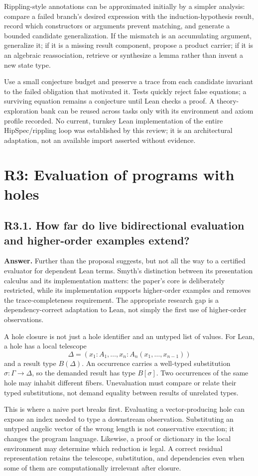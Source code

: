 \documentclass[11pt,a4paper]{article}
\newcommand{\question}[2]{\subsection{#1. #2}\label{q:#1}}
\theoremstyle{definition}
\theoremstyle{remark}
\begin{document}
Rippling-style annotations can be approximated initially by a simpler analysis: compare a failed branch's desired expression with the induction-hypothesis result, record which constructors or arguments prevent matching, and generate a bounded candidate generalization. If the mismatch is an accumulating argument, generalize it; if it is a missing result component, propose a product carrier; if it is an algebraic reassociation, retrieve or synthesize a lemma rather than invent a new state type.

Use a small conjecture budget and preserve a trace from each candidate invariant to the failed obligation that motivated it. Tests quickly reject false equations; a surviving equation remains a conjecture until Lean checks a proof. A theory-exploration bank can be reused across tasks only with its environment and axiom profile recorded. No current, turnkey Lean implementation of the entire HipSpec/rippling loop was established by this review; it is an architectural adaptation, not an available import asserted without evidence.

\section{R3: Evaluation of programs with holes}\label{sec:r3}

\question{R3.1}{How far do live bidirectional evaluation and higher-order examples extend?}

\textbf{Answer.} Further than the proposal suggests, but not all the way to a certified evaluator for dependent Lean terms. Smyth's distinction between its presentation calculus and its implementation matters: the paper's core is deliberately restricted, while its implementation supports higher-order examples and removes the trace-completeness requirement.\cite{smyth} The appropriate research gap is a dependency-correct adaptation to Lean, not simply the first use of higher-order observations.

A hole closure is not just a hole identifier and an untyped list of values. For Lean, a hole has a local telescope
\[
 \Delta=(x_1:A_1,\ldots,x_n:A_n(x_1,\ldots,x_{n-1}))
\]
and a result type $B(\Delta)$. An occurrence carries a well-typed substitution $\sigma:\Gamma\to\Delta$, so the demanded result has type $B[\sigma]$. Two occurrences of the same hole may inhabit different fibers. Unevaluation must compare or relate their typed substitutions, not demand equality between results of unrelated types.

This is where a naive port breaks first. Evaluating a vector-producing hole can expose an index needed to type a downstream observation. Substituting an untyped angelic vector of the wrong length is not conservative execution; it changes the program language. Likewise, a proof or dictionary in the local environment may determine which reduction is legal. A correct residual representation retains the telescope, substitution, and dependencies even when some of them are computationally irrelevant after closure.
\end{document}
